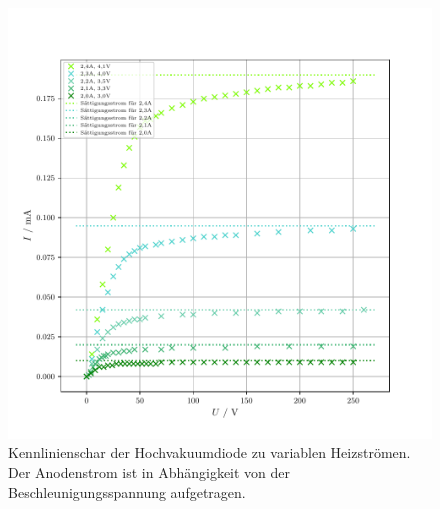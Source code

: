 \begin{figure}[H]
  \centering
  \includegraphics{plota.pdf}
  \caption{Kennlinienschar der Hochvakuumdiode zu variablen Heizströmen. Der Anodenstrom ist in Abhängigkeit von der Beschleunigungsspannung aufgetragen.}
  \label{fig:plota}
\end{figure}

